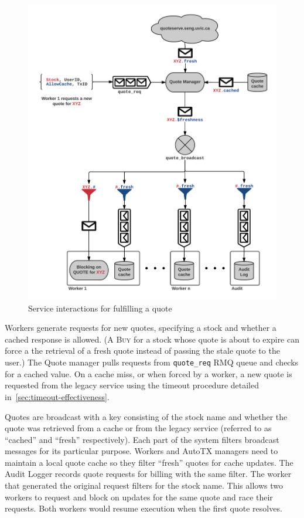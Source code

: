 \begin{figure}[tbph]
  \centering
  \includegraphics[width=0.85\linewidth]{graphics/arch-quotes}
  \caption{Service interactions for fulfilling a quote}
  \label{fig:arch-quotes}
\end{figure}

Workers generate requests for new quotes, specifying a stock and whether a cached response is allowed. (A \textsc{Buy} for a stock whose quote is about to expire can force a the retrieval of a fresh quote instead of passing the stale quote to the user.) The Quote manager pulls requests from \texttt{quote\_req} RMQ queue and checks for a cached value.
On a cache miss, or when forced by a worker, a new quote is requested from the legacy service using the timeout procedure detailed in~\ref{sec:timeout-effectiveness}.

Quotes are broadcast with a key consisting of the stock name and whether the quote was retrieved from a cache or from the legacy service (referred to as ``cached'' and ``fresh'' respectively).
Each part of the system filters broadcast messages for its particular purpose.
Workers and AutoTX managers need to maintain a local quote cache so they filter ``fresh'' quotes for cache updates.
The Audit Logger records quote requests for billing with the same filter.
The worker that generated the original request filters for the stock name.
This allows two workers to request and block on updates for the same quote and race their requests.
Both workers would resume execution when the first quote resolves.


